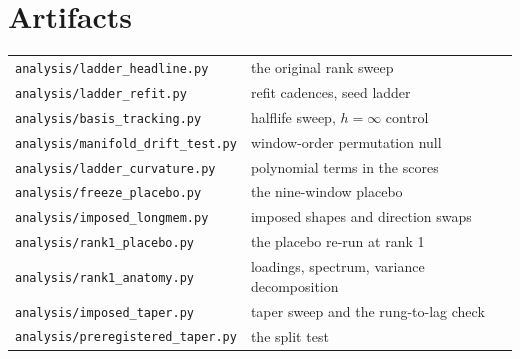 \documentclass[11pt,a4paper]{article}
\begin{document}
\section*{Artifacts}

\begin{tabular}{ll}
\toprule
\texttt{analysis/ladder\_headline.py} & the original rank sweep \\
\texttt{analysis/ladder\_refit.py} & refit cadences, seed ladder \\
\texttt{analysis/basis\_tracking.py} & halflife sweep, $h=\infty$ control \\
\texttt{analysis/manifold\_drift\_test.py} & window-order permutation null \\
\texttt{analysis/ladder\_curvature.py} & polynomial terms in the scores \\
\texttt{analysis/freeze\_placebo.py} & the nine-window placebo \\
\texttt{analysis/imposed\_longmem.py} & imposed shapes and direction swaps \\
\texttt{analysis/rank1\_placebo.py} & the placebo re-run at rank 1 \\
\texttt{analysis/rank1\_anatomy.py} & loadings, spectrum, variance decomposition \\
\texttt{analysis/imposed\_taper.py} & taper sweep and the rung-to-lag check \\
\texttt{analysis/preregistered\_taper.py} & the split test \\
\bottomrule
\end{tabular}
\end{document}
